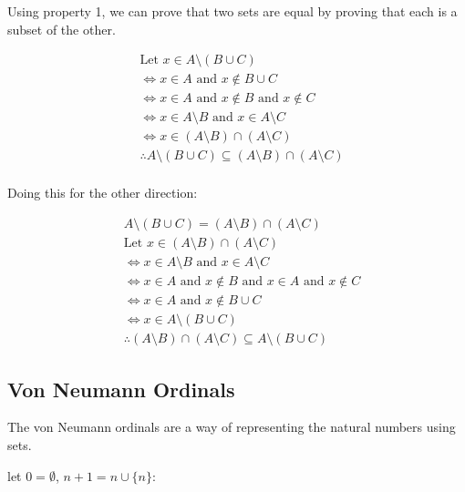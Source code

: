 \documentclass{article}
\begin{document}
Using property 1, we can prove that two sets are equal by proving that each is a subset of the other.

\begin{align*}
     & \text{Let } x \in A\setminus (B\cup C)                                      \\
     & \iff x \in A \text{ and } x \notin B \cup C                                 \\
     & \iff x \in A \text{ and } x \notin B \text{ and } x \notin C                \\
     & \iff x \in A \setminus B \text{ and } x \in A \setminus C                   \\
     & \iff x \in (A \setminus B) \cap (A \setminus C)                             \\
     & \therefore A\setminus (B\cup C) \subseteq (A\setminus B)\cap (A\setminus C) \\
\end{align*}

Doing this for the other direction:

\begin{align*}
     & A\setminus (B\cup C)= (A\setminus B)\cap (A\setminus C)                           \\
     & \text{Let } x\in (A\setminus B)\cap (A\setminus C)                                \\
     & \iff x \in A\setminus B \text{ and } x \in A\setminus C                           \\
     & \iff x \in A \text{ and } x \notin B \text{ and } x \in A \text{ and } x \notin C \\
     & \iff x \in A \text{ and } x \notin B \cup C                                       \\
     & \iff x \in A \setminus (B \cup C)                                                 \\
     & \therefore (A\setminus B)\cap (A\setminus C) \subseteq A\setminus (B\cup C)
\end{align*}

\subsection{Von Neumann Ordinals}

The von Neumann ordinals are a way of representing the natural numbers using sets.


let $0 = \emptyset$, $n + 1 = n \cup \{n\}$:
\end{document}

